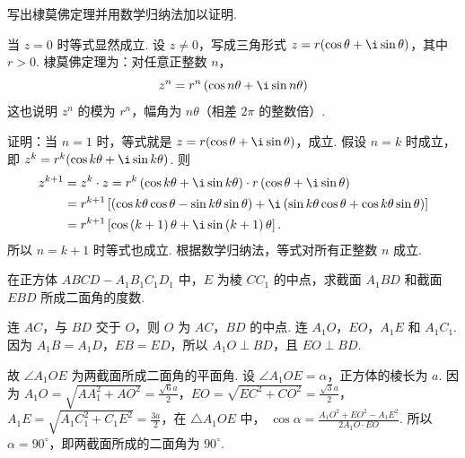 \begin{problem}

写出棣莫佛定理并用数学归纳法加以证明.
\end{problem}

\begin{solution}
当 \(z=0\) 时等式显然成立. 设 \(z\neq0\)，写成三角形式 \(z=r(\cos\theta+\i\sin\theta)\)，其中 \(r>0\). 棣莫佛定理为：对任意正整数 \(n\)，
\[
z^n=r^n\left(\cos n\theta+\i\sin n\theta\right)
\]
这也说明 \(z^n\) 的模为 \(r^n\)，幅角为 \(n\theta\)（相差 \(2\pi\) 的整数倍）.

证明：当 \(n=1\) 时，等式就是 \(z=r(\cos\theta+\i\sin\theta)\)，成立. 假设 \(n=k\) 时成立，即
\(z^k=r^k(\cos k\theta+\i\sin k\theta)\). 则
\[
\begin{aligned}
z^{k+1}
&=z^{k}\cdot z
=r^{k}\left( \cos k\theta+\i\sin k\theta \right)\cdot r\left( \cos \theta+\i\sin \theta \right)\\
&=r^{k+1}\left[ \left( \cos k\theta\cos \theta-\sin k\theta\sin \theta \right)+\i\left( \sin k\theta\cos \theta+\cos k\theta\sin \theta \right) \right]\\
&=r^{k+1}\left[ \cos \left( k+1 \right)\theta+\i\sin \left( k+1 \right)\theta \right].
\end{aligned}
\]
所以 \(n=k+1\) 时等式也成立. 根据数学归纳法，等式对所有正整数 \(n\) 成立.
\end{solution}

\begin{problem}

在正方体 \(ABCD - A_{1}B_{1}C_{1}D_{1}\) 中，\(E\) 为棱 \(CC_{1}\) 的中点，求截面 \(A_{1}BD\) 和截面 \(EBD\) 所成二面角的度数.

\end{problem}

\begin{solution}
%
连 \(AC\)，与 \(BD\) 交于 \(O\)，则 \(O\) 为 \(AC\)，\(BD\) 的中点. 连 \(A_{1}O\)，\(EO\)，\(A_{1}E\) 和 \(A_{1}C_{1}\).
因为 \(A_{1}B=A_{1}D\)，\(EB=ED\)，所以 \(A_{1}O\perp BD\)，且 \(EO\perp BD\).

故 \(\angle A_{1}OE\) 为两截面所成二面角的平面角. 设 \(\angle A_{1}OE=\alpha\)，正方体的棱长为 \(a\).
因为 \(A_{1}O=\sqrt{AA_{1}^{2}+AO^{2}}=\frac{\sqrt{6}a}{2}\)，\(EO=\sqrt{EC^{2}+CO^{2}}=\frac{\sqrt{3}a}{2}\)，\(A_{1}E=\sqrt{A_{1}C_{1}^{2}+C_{1}E^{2}}=\frac{3a}{2}\)，在 \(\triangle A_{1}OE\) 中，
\(\cos \alpha=\frac{A_{1}O^{2}+EO^{2}-A_{1}E^{2}}{2A_{1}O\cdot EO}\).
所以 \(\alpha=90^{\circ}\)，即两截面所成的二面角为 \(90^{\circ}\).
\end{solution}

